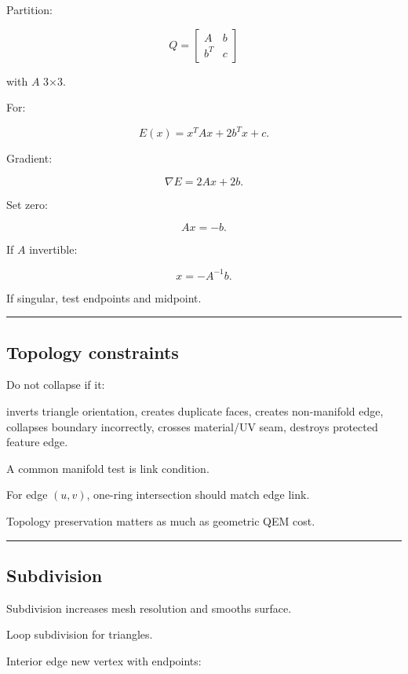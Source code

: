 Partition:

\[
Q=
\begin{bmatrix}
A&b\\
b^T&c
\end{bmatrix}
\]

with \(A\) 3×3.

For:

\[
E(x)=x^TAx+2b^Tx+c.
\]

Gradient:

\[
\nabla E=
2Ax+2b.
\]

Set zero:

\[
\boxed{
Ax=-b.
}
\]

If \(A\) invertible:

\[
x=-A^{-1}b.
\]

If singular, test endpoints and midpoint.

\begin{center}\rule{0.5\linewidth}{0.5pt}\end{center}

\subsection{Topology constraints}\label{04-visual-computing-ii-ch041-topology-constraints}

Do not collapse if it:

inverts triangle orientation, creates duplicate faces, creates non-manifold edge, collapses boundary incorrectly, crosses material/UV seam, destroys protected feature edge.

A common manifold test is link condition.

For edge \((u,v)\), one-ring intersection should match edge link.

Topology preservation matters as much as geometric QEM cost.

\begin{center}\rule{0.5\linewidth}{0.5pt}\end{center}

\subsection{Subdivision}\label{04-visual-computing-ii-ch041-subdivision}

Subdivision increases mesh resolution and smooths surface.

Loop subdivision for triangles.

Interior edge new vertex with endpoints:

